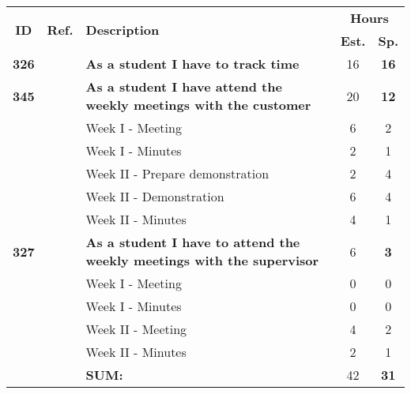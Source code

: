 \label{tab:sprint4storiesProcess}
\def\arraystretch{1.25}
 
\begin{longtable}{ccXcc}

\toprule[0.5mm]
\multirow{2}{*}{\textbf{ID}} &
\multirow{2}{*}{\textbf{Ref.}} & \multirow{2}{*}{\textbf{Description}} & \multicolumn{2}{c}{\textbf{Hours}} \\
 					& & & \textbf{Est.} & \textbf{Sp.} \\

\midrule

\textbf{326} 	&& {\bf  As a student I have to track time} 										& 	16	& \textbf{16} \\
	
\textbf{345} 	&& {\bf As a student I have attend the weekly meetings with the customer} 			& 	20	& \textbf{12} \\
		&& Week I - Meeting							&  6 & 2 \\
		&& Week I - Minutes							&  2 & 1 \\
		&& Week II - Prepare demonstration			&  2 & 4 \\
		&& Week II - Demonstration					&  6 & 4 \\
		&& Week II - Minutes						&  4 & 1 \\


		
\textbf{327} 	&& {\bf As a student I have to attend the weekly meetings with the supervisor} 		& 	6	& \textbf{3} \\
		&& Week I - Meeting							&  0 & 0 \\
		&& Week I - Minutes							&  0 & 0 \\
		&& Week II - Meeting						&  4 & 2 \\
		&& Week II - Minutes						&  2 & 1 \\

				
				
\hline
				&& \textbf{SUM:}		&		42	& \textbf{31}
 \\																			
\bottomrule[0.5mm]
\end{longtable}
